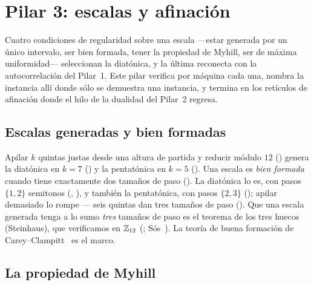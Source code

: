 
\section{Pilar 3: escalas y afinación}\label{sec:pillar3}


Cuatro condiciones de regularidad sobre una escala ---estar generada por un único intervalo, ser bien
formada, tener la propiedad de Myhill, ser de máxima uniformidad--- seleccionan la diatónica, y la última
reconecta con la autocorrelación del Pilar~1. Este pilar verifica por máquina cada una, nombra la instancia
allí donde sólo se demuestra una instancia, y termina en los retículos de afinación donde el hilo de la
dualidad del Pilar~2 regresa.

\subsection{Escalas generadas y bien formadas}\label{sec:p3-genwf}

Apilar $k$ quintas justas desde una altura de partida y reducir módulo $12$ () genera la
diatónica en $k=7$ () y la pentatónica en $k=5$
(). Una escala es \emph{bien formada} cuando tiene exactamente dos
tamaños de paso (). La diatónica lo es, con pasos $\{1,2\}$ semitonos
(, ), y también la pentatónica, con pasos $\{2,3\}$
(); apilar demasiado lo rompe --- seis quintas dan tres tamaños de paso
(). Que una escala generada tenga a lo sumo \emph{tres} tamaños de paso es
el teorema de los tres huecos (Steinhaus), que verificamos en $\mathbb{Z}_{12}$ (;
Sós~\cite{Steinhaus}). La teoría de buena formación de Carey--Clampitt~\cite{CareyClampitt} es el marco.

\subsection{La propiedad de Myhill}\label{sec:p3-myhill}

